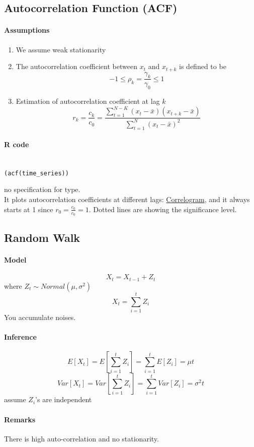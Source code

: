 \documentclass[11pt]{article}
\newcommand{\under}[1]{\underline{#1}}
\begin{document}
\subsection{Autocorrelation Function (ACF)}
\paragraph{Assumptions}
\begin{enumerate}
	\item We assume weak stationarity
	\item The autocorrelation coefficient between $x_t$ and $x_{t+k}$ is defined to be 
	$$ -1 \leq \rho_k = \frac{\gamma_k}{\gamma_0} \leq 1$$
	\item Estimation of autocorrelation coefficient at lag $k$
	$$ r_k = \frac{c_k}{c_0} = \frac{\sum_{t=1}^{N-K}(x_t - \bar{x})(x_{t+k} - \bar{x})}{\sum_{t=1}^N(x_t - \bar{x})^2}$$
\end{enumerate}

\paragraph{R code}
\begin{align*}
\end{align*}
\begin{lstlisting}
(acf(time_series))
\end{lstlisting}
no specification for type. \\
It plots autocorrelation coefficients at different lags: \under{Correlogram}, and it always starts at 1 since $r_0 = \frac{c_0}{c_0} = 1$. Dotted lines are showing the significance level.

\subsection{Random Walk}
\paragraph{Model}
$$X_t = X_{t-1} + Z_t$$
where $Z_t \sim Normal(\mu, \sigma^2)$
$$X_t = \sum_{i=1}^t Z_i$$
You accumulate noises.
\paragraph{Inference}
$$E[X_t] = E[\sum_{i=1}^t Z_i] = \sum_{i=1}^t E[Z_i] = \mu t$$
$$Var[X_t] = Var[\sum_{i=1}^t Z_i] = \sum_{i=1}^t Var[Z_i] = \sigma^2t$$
assume $Z_i$'s are independent
\paragraph{Remarks}
There is high auto-correlation and no stationarity.
\end{document}
